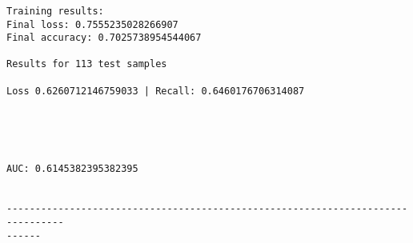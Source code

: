 \documentclass[11pt]{article}
\begin{document}
    \begin{center}
    \end{center}
    { \hspace*{\fill} \\}
    
    \begin{center}
    \end{center}
    { \hspace*{\fill} \\}
    
    \begin{Verbatim}[commandchars=\\\{\}]

Training results:
Final loss: 0.7555235028266907
Final accuracy: 0.7025738954544067

Results for 113 test samples

Loss 0.6260712146759033 | Recall: 0.6460176706314087



    \end{Verbatim}

    \begin{center}
    \end{center}
    { \hspace*{\fill} \\}
    
    \begin{Verbatim}[commandchars=\\\{\}]
AUC: 0.6145382395382395


--------------------------------------------------------------------------------
------


    \end{Verbatim}

    \begin{center}
    \end{center}
    { \hspace*{\fill} \\}
    
    \begin{center}
    \end{center}
    { \hspace*{\fill} \\}
    
\end{document}

